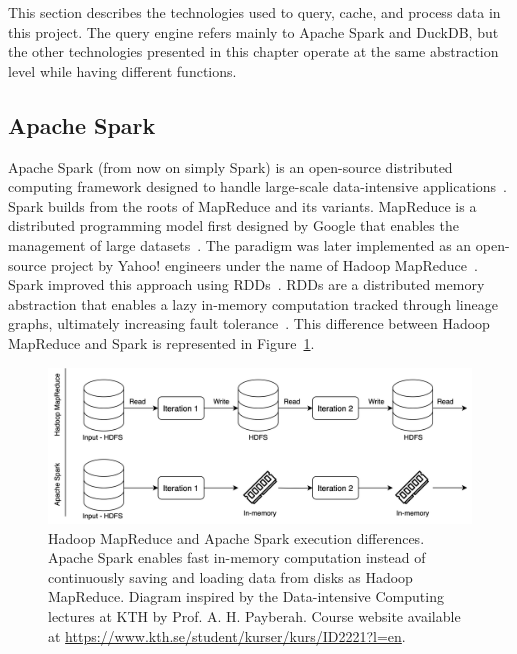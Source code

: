 This section describes the technologies used to query, cache, and process data in this project. The query engine refers mainly to Apache Spark and DuckDB, but the other technologies presented in this chapter operate at the same abstraction level while having different functions.

\subsection{Apache Spark}

Apache Spark (from now on simply Spark) is an open-source distributed computing framework designed to handle large-scale data-intensive applications~\cite{zahariaApacheSparkUnified2016}. Spark builds from the roots of MapReduce and its variants. MapReduce is a distributed programming model first designed by Google that enables the management of large datasets~\cite{dean2004mapreduce}. The paradigm was later implemented as an open-source project by Yahoo! engineers under the name of Hadoop MapReduce~\cite{borthakurHadoopDistributedFile2005}. Spark improved this approach using \glspl{RDD}~\cite{Zaharia:EECS-2011-82}. \glspl{RDD} are a distributed memory abstraction that enables a lazy in-memory computation tracked through lineage graphs, ultimately increasing fault tolerance~\cite{Zaharia:EECS-2011-82}. This difference between Hadoop MapReduce and Spark is represented in Figure~\ref{fig:MapReducevsSpark}.

\begin{figure}[!ht]
  \begin{center}
    \includegraphics[width=\textwidth]{figures/2-background/Spark_MapReduce.png}
  \end{center}
  \caption[Hadoop MapReduce vs. Apache Spark]{Hadoop MapReduce and Apache Spark execution differences. Apache Spark enables fast in-memory computation instead of continuously saving and loading data from disks as Hadoop MapReduce. Diagram inspired by the Data-intensive Computing lectures at KTH by Prof. A. H. Payberah. Course website available at \url{https://www.kth.se/student/kurser/kurs/ID2221?l=en}.}
  \label{fig:MapReducevsSpark}
\end{figure}


